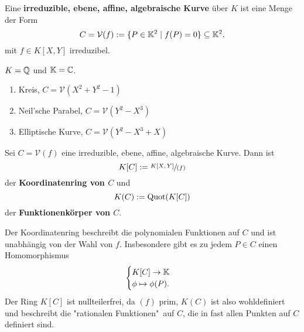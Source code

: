 \begin{definition}
    Eine \textbf{irreduzible, ebene, affine, algebraische Kurve} über $K$ ist eine Menge der Form
    $$ C = \mathcal{V}(f) := \{P \in \mathbb{K}^2 \mid f(P) = 0\} \subseteq \mathbb{K}^2,$$
    mit $f \in K[X,Y]$ irreduzibel.
\end{definition}

\begin{beispiel}\label{beispiel:2.2}
    $K = \mathbb{Q}$ und $\mathbb{K} = \mathbb{C}$.
    \begin{enumerate}[label=\alph*)]
        \item Kreis, $C = \mathcal{V}(X^2 + Y^2 - 1)$
        \item Neil'sche Parabel, $C = \mathcal{V}(Y^2 - X^3)$
        \item Elliptische Kurve, $C = \mathcal{V}(Y^2 - X^3 + X)$
    \end{enumerate}
\end{beispiel}

\begin{definition}
    Sei $C = \mathcal{V}(f)$ eine irreduzible, ebene, affine, algebraische Kurve. 
    Dann ist $$ K[C] := \sfrac{K[X,Y]}{(f)} $$ der \textbf{Koordinatenring von $C$} und
    $$ K(C) := \operatorname{Quot}(K[C]) $$ der \textbf{Funktionenkörper von $C$}.
\end{definition}

\begin{bemerkungnr}
    Der Koordinatenring beschreibt die polynomialen Funktionen auf $C$ und ist unabhängig von der Wahl von $f$.
    Insbesondere gibt es zu jedem $P \in C$ einen Homomorphismus
    $$ \begin{cases}
        K[C] \to \mathbb{K} \\
        \phi \mapsto \phi(P).
    \end{cases}$$
    Der Ring $K[C]$ ist nullteilerfrei, da $(f)$ prim, $K(C)$ ist also wohldefiniert und beschreibt die 
    "rationalen Funktionen"\ auf $C$, die in fast allen Punkten auf $C$ definiert sind.
\end{bemerkungnr}

